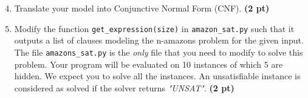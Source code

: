 \documentclass[11pt,a4paper]{report}
\begin{document}
\begin{answers}[10cm]

\end{answers}
\newpage

\begin{enumerate}
	\setcounter{enumi}{3}
	\item Translate your model into Conjunctive Normal Form (CNF). \textbf{(2 pt)}
\end{enumerate}

\begin{answers}[10cm]

\end{answers}

\begin{enumerate}
	\setcounter{enumi}{4}
	\item Modify the function {\tt get\_expression(size)} in \texttt{amazon\_sat.py} such that it outputs a list
	of clauses modeling the n-amazons problem for the given input.
	The file \texttt{amazons\_sat.py} is the \emph{only} file that you need to modify to solve this problem. 
	Your program will be evaluated on 10 instances of which 5 are hidden. We expect you to solve all the instances.
	An unsatisfiable instance is considered as solved if the solver returns \textit{"UNSAT"}. \textbf{(2 pt)}
\end{enumerate}
\end{document}
